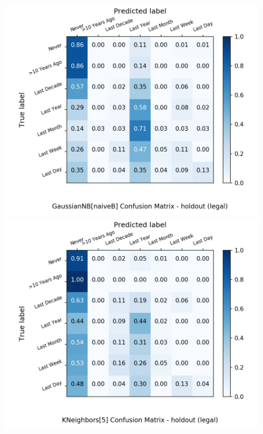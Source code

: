 \begin{figure}[H]
\begin{minipage}[b]{0.32\textwidth}
		\includegraphics[width=1.1\textwidth]{Plots/drugs/legal_GaussianNB_naiveB_balance_False_holdout.png}
	\end{minipage}
	\begin{minipage}[b]{0.32\textwidth}
		\includegraphics[width=1.1\textwidth]{Plots/drugs/legal_KNeighbors_5_balance_False_holdout.png}
  \end{minipage}
	\begin{minipage}[b]{0.32\textwidth}

\end{minipage}
\end{figure}
